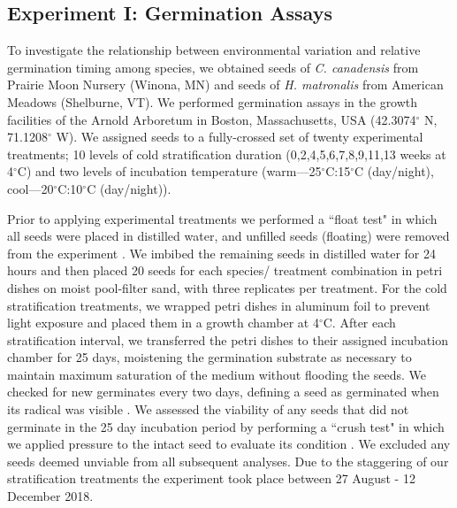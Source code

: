 \documentclass{article}[11pt]
\begin{document}
\subsection*{Experiment I: Germination Assays}
To investigate the relationship between environmental variation and relative germination timing among species, we obtained seeds of \textit{C. canadensis} from Prairie Moon Nursery (Winona, MN) and seeds of \textit{H. matronalis} from American Meadows (Shelburne, VT). %
We performed germination assays in the growth facilities of the Arnold Arboretum in Boston, Massachusetts, USA (42.3074$^{\circ}$ N, 71.1208$^{\circ}$ W). We assigned seeds to a fully-crossed set of twenty experimental treatments; 10 levels of cold stratification duration (0,2,4,5,6,7,8,9,11,13 weeks at 4$^{\circ}$C) and two levels of incubation temperature (warm---25$^{\circ}$C:15$^{\circ}$C (day/night), cool---20$^{\circ}$C:10$^{\circ}$C (day/night)).

\noindent  Prior to applying experimental treatments we performed a ``float test" in which all seeds were placed in distilled water, and unfilled seeds (floating) were removed from the experiment \citep{Baskin2014}. We imbibed the remaining seeds in distilled water for 24 hours and then placed 20 seeds for each species/ treatment combination in petri dishes on moist pool-filter sand, with three replicates per treatment. For the cold stratification treatments, we wrapped petri dishes in aluminum foil to prevent light exposure and placed them in a growth chamber at 4$^{\circ}$C. After each stratification interval, we transferred the petri dishes to their assigned incubation chamber for 25 days, moistening the germination substrate as necessary to maintain maximum saturation of the medium without flooding the seeds. We checked for new germinates every two days, defining a seed as germinated when its radical was visible \citep{Baskin2014}. We assessed the viability of any seeds that did not germinate in the 25 day incubation period by performing a ``crush test" in which we applied pressure to the intact seed to evaluate its condition \citep{Baskin2014}. We excluded any seeds deemed unviable from all subsequent analyses. Due to the staggering of our stratification treatments the experiment took place between 27 August - 12 December 2018.
\end{document}
